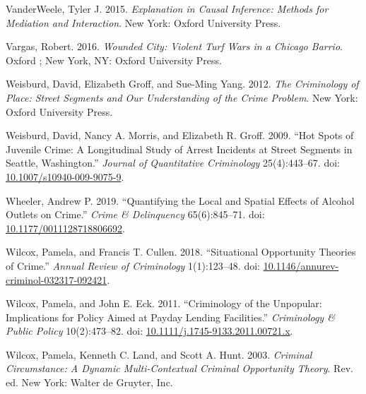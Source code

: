 \documentclass [11pt, proquest] {uwthesis}[2015/03/03]
\newlength{\cslhangindent}
\newenvironment{CSLReferences}[2]%
{\setlength{\parindent}{0pt}%
\everypar{\setlength{\hangindent}{\cslhangindent}}\ignorespaces}%
{\par}
\begin{document}
\begin{CSLReferences}{1}{0}
\leavevmode\hypertarget{ref-vanderweeleExplanationCausalInference2015}{}%
VanderWeele, Tyler J. 2015. \emph{Explanation in Causal Inference: Methods for Mediation and Interaction}. {New York}: {Oxford University Press}.

\leavevmode\hypertarget{ref-vargasWoundedCityViolent2016}{}%
Vargas, Robert. 2016. \emph{Wounded City: Violent Turf Wars in a {Chicago} Barrio}. {Oxford ; New York, NY}: {Oxford University Press}.

\leavevmode\hypertarget{ref-weisburdCriminologyPlaceStreet2012}{}%
Weisburd, David, Elizabeth Groff, and Sue-Ming Yang. 2012. \emph{The Criminology of Place: Street Segments and Our Understanding of the Crime Problem}. {New York}: {Oxford University Press}.

\leavevmode\hypertarget{ref-weisburdHotSpotsJuvenile2009}{}%
Weisburd, David, Nancy A. Morris, and Elizabeth R. Groff. 2009. {``Hot {Spots} of {Juvenile Crime}: {A Longitudinal Study} of {Arrest Incidents} at {Street Segments} in {Seattle}, {Washington}.''} \emph{Journal of Quantitative Criminology} 25(4):443--67. doi: \href{https://doi.org/10.1007/s10940-009-9075-9}{10.1007/s10940-009-9075-9}.

\leavevmode\hypertarget{ref-wheelerQuantifyingLocalSpatial2019}{}%
Wheeler, Andrew P. 2019. {``Quantifying the {Local} and {Spatial Effects} of {Alcohol Outlets} on {Crime}.''} \emph{Crime \& Delinquency} 65(6):845--71. doi: \href{https://doi.org/10.1177/0011128718806692}{10.1177/0011128718806692}.

\leavevmode\hypertarget{ref-wilcoxSituationalOpportunityTheories2018}{}%
Wilcox, Pamela, and Francis T. Cullen. 2018. {``Situational {Opportunity Theories} of {Crime}.''} \emph{Annual Review of Criminology} 1(1):123--48. doi: \href{https://doi.org/10.1146/annurev-criminol-032317-092421}{10.1146/annurev-criminol-032317-092421}.

\leavevmode\hypertarget{ref-wilcoxCriminologyUnpopularImplications2011}{}%
Wilcox, Pamela, and John E. Eck. 2011. {``Criminology of the Unpopular: {Implications} for Policy Aimed at Payday Lending Facilities.''} \emph{Criminology \& Public Policy} 10(2):473--82. doi: \href{https://doi.org/10.1111/j.1745-9133.2011.00721.x}{10.1111/j.1745-9133.2011.00721.x}.

\leavevmode\hypertarget{ref-wilcoxCriminalCircumstanceDynamic2003}{}%
Wilcox, Pamela, Kenneth C. Land, and Scott A. Hunt. 2003. \emph{Criminal {Circumstance}: {A Dynamic Multi}-{Contextual Criminal Opportunity Theory}}. Rev. ed. {New York}: {Walter de Gruyter, Inc}.


\end{CSLReferences}
\end{document}
